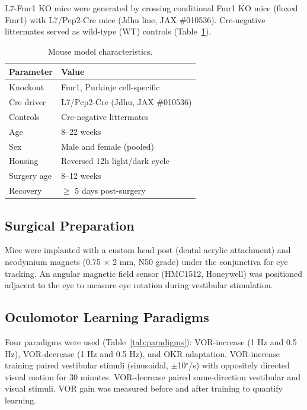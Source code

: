 \documentclass[11pt]{article}
\begin{document}
L7-Fmr1 KO mice were generated by crossing conditional Fmr1 KO mice (floxed Fmr1) with L7/Pcp2-Cre mice (Jdhu line, JAX \#010536). Cre-negative littermates served as wild-type (WT) controls (Table~\ref{tab:mice}).

\begin{table}[h]
\centering
\caption{Mouse model characteristics.}
\label{tab:mice}
\begin{tabular}{ll}
\toprule
Parameter & Value \\
\midrule
Knockout & Fmr1, Purkinje cell-specific \\
Cre driver & L7/Pcp2-Cre (Jdhu, JAX \#010536) \\
Controls & Cre-negative littermates \\
Age & 8--22 weeks \\
Sex & Male and female (pooled) \\
Housing & Reversed 12h light/dark cycle \\
Surgery age & 8--12 weeks \\
Recovery & $\geq$ 5 days post-surgery \\
\bottomrule
\end{tabular}
\end{table}

\subsection{Surgical Preparation}

Mice were implanted with a custom head post (dental acrylic attachment) and neodymium magnets (0.75 $\times$ 2 mm, N50 grade) under the conjunctiva for eye tracking. An angular magnetic field sensor (HMC1512, Honeywell) was positioned adjacent to the eye to measure eye rotation during vestibular stimulation.

\subsection{Oculomotor Learning Paradigms}

Four paradigms were used (Table~\ref{tab:paradigms}): VOR-increase (1 Hz and 0.5 Hz), VOR-decrease (1 Hz and 0.5 Hz), and OKR adaptation. VOR-increase training paired vestibular stimuli (sinusoidal, $\pm$10$^{\circ}$/s) with oppositely directed visual motion for 30 minutes. VOR-decrease paired same-direction vestibular and visual stimuli. VOR gain was measured before and after training to quantify learning.
\end{document}
